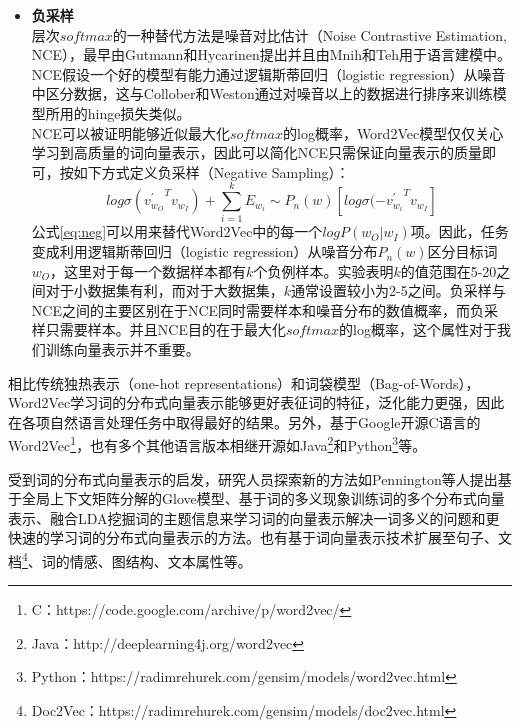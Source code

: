 \documentclass[master]{njuthesis}
\begin{document}
\begin{itemize}
\item \textbf{负采样}\\
		层次$softmax$的一种替代方法是噪音对比估计（Noise Contrastive Estimation, NCE），最早由Gutmann和Hycarinen提出\cite{gutmann2012noise}并且由Mnih和Teh用于语言建模中\cite{mnih2012fast}。NCE假设一个好的模型有能力通过逻辑斯蒂回归（logistic regression）从噪音中区分数据，这与Collober和Weston通过对噪音以上的数据进行排序来训练模型所用的hinge损失类似\cite{collobert2008unified}。\\
		NCE可以被证明能够近似最大化$softmax$的log概率，Word2Vec模型仅仅关心学习到高质量的词向量表示，因此可以简化NCE只需保证向量表示的质量即可，按如下方式定义负采样（Negative Sampling）：
		\begin{equation}\label{eq:neg}
		log\sigma({v_{w_O}^{'}}^Tv_{w_I})+\sum_{i=1}^{k}E_{w_i}\sim P_{n}(w)\left [log\sigma(-{v_{w_i}^{'}}^Tv_{w_I}\right ]
		\end{equation}
		公式\ref{eq:neg}可以用来替代Word2Vec中的每一个$logP(w_O|w_I)$项。因此，任务变成利用逻辑斯蒂回归（logistic regression）从噪音分布$P_n(w)$区分目标词$w_O$，这里对于每一个数据样本都有$k$个负例样本。实验表明$k$的值范围在5-20之间对于小数据集有利，而对于大数据集，$k$通常设置较小为2-5之间。负采样与NCE之间的主要区别在于NCE同时需要样本和噪音分布的数值概率，而负采样只需要样本。并且NCE目的在于最大化$softmax$的log概率，这个属性对于我们训练向量表示并不重要。
\end{itemize}

相比传统独热表示（one-hot representations）和词袋模型（Bag-of-Words），Word2Vec学习词的分布式向量表示能够更好表征词的特征，泛化能力更强，因此在各项自然语言处理任务中取得最好的结果\cite{mikolov2013efficient,mikolov2013distributed,mikolov2013linguistic,dos2014deep,tang2014learning}。另外，基于Google开源C语言的Word2Vec\footnote{C：https://code.google.com/archive/p/word2vec/}，也有多个其他语言版本相继开源如Java\footnote{Java：http://deeplearning4j.org/word2vec}和Python\footnote{Python：https://radimrehurek.com/gensim/models/word2vec.html}等。

受到词的分布式向量表示的启发，研究人员探索新的方法如Pennington等人提出基于全局上下文矩阵分解的Glove模型\cite{pennington2014glove}、基于词的多义现象训练词的多个分布式向量表示\cite{qiu2014co,reisinger2010multi}、融合LDA挖掘词的主题信息来学习词的向量表示解决一词多义的问题\cite{liu2015topical}和更快速的学习词的分布式向量表示的方法\cite{yogatama2014learning,mnih2013learning}。也有基于词向量表示技术扩展至句子、文档\footnote{Doc2Vec：https://radimrehurek.com/gensim/models/doc2vec.html}、词的情感、图结构、文本属性等\cite{le2014distributed,kalchbrenner2014convolutional,tang2014learning,tang2015line,kiros2014multiplicative}。
\end{document}
